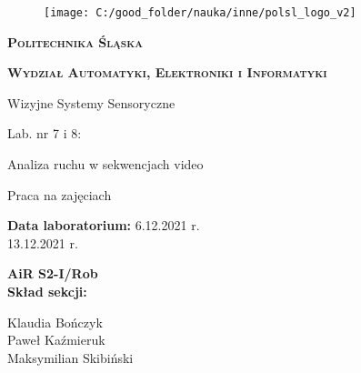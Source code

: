 \documentclass[11pt, a4paper]{article}
\begin{document}

\begin{titlepage}
{\LARGE
\begin{center}
	\begin{figure}[h!]
		\centering
		\texttt{[image: C:/good\_folder/nauka/inne/polsl\_logo\_v2]}
	\end{figure}
	
	\vspace{0.25cm}
	
	\textbf{\textsc{Politechnika Śląska}}
	
	\textbf{\textsc{Wydział Automatyki, Elektroniki i Informatyki}}
	
	\vspace{1.5cm}
	
	Wizyjne Systemy Sensoryczne
	
	\vspace{1.5cm}
	
	Lab. nr 7 i 8:
	
	Analiza ruchu w sekwencjach video
	
	\vspace{0.5cm}
	
	{\Large Praca na zajęciach}
\end{center}
}

\vfill

{\Large
\noindent
\textbf{Data laboratorium:} \phantom{0}6.12.2021 r.\\
 13.12.2021 r.

\vspace{0.5cm}

\noindent
\textbf{AiR S2-I/Rob}\\
\textbf{Skład sekcji:}

\noindent
\hspace*{0.5cm} Klaudia Bończyk\\
\hspace*{0.5cm} Paweł Kaźmieruk\\
\hspace*{0.5cm} Maksymilian Skibiński\\


\vspace{0.5cm}
}

\begin{center}
\end{center}
\end{titlepage}
\end{document}

